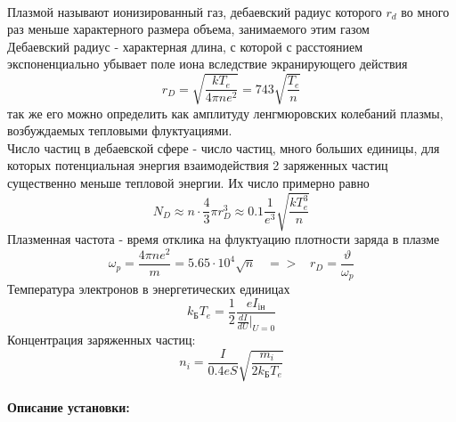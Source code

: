 \documentclass[a4paper,12pt]{article}
\begin{document}
\paragraph{}
Плазмой называют ионизированный газ, дебаевский радиус которого $r_d$ во много раз меньше характерного размера объема, занимаемого этим газом \\
Дебаевский радиус - характерная длина, с которой с расстоянием экспоненциально убывает поле иона вследствие экранирующего действия
\begin{equation}
r_{D} = \sqrt{\frac{kT_{e}}{4\pi n e^2}}=743\sqrt{\frac{T_{e}}{n}}
\end{equation}
так же его можно определить как амплитуду ленгмюровских колебаний плазмы, возбуждаемых тепловыми флуктуациями. \\
Число частиц в дебаевской сфере - число частиц, много больших единицы, для которых потенциальная энергия взаимодействия 2 заряженных частиц существенно меньше тепловой энергии. Их число примерно равно
\begin{equation*}
N_{D}\approx n\cdot \frac{4}{3}\pi r^3_{D} \approx 0.1\frac{1}{e^3}\sqrt{\frac{kT_e^3}{n}}
\end{equation*}
Плазменная частота - время отклика на флуктуацию плотности заряда в плазме
\begin{equation}
\omega_{p} = \frac{4\pi ne^2}{m} = 5.65\cdot 10^4 \sqrt{n} \;\;\;=>\;\;\; r_{D} = \frac{\vartheta}{\omega_{p}}
\end{equation}
Температура электронов в энергетических единицах
\begin{equation}
k_\text{Б}T_e = \frac{1}{2}\frac{eI_{\text{iн}}}{\frac{dI}{dU}|_{U=0}}
\end{equation}
Концентрация заряженных частиц:
\begin{equation}
n_i = \frac{I}{0.4eS}\sqrt{\frac{m_i}{2k_{\text{Б}}T_e}}
\end{equation}
\paragraph{Описание установки:}
\end{document}
